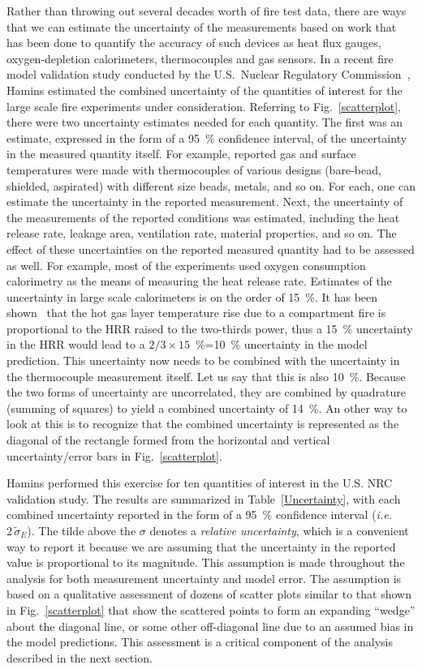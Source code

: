 Rather than throwing out several decades worth of fire test data, there are ways that we can estimate the uncertainty of the measurements based on work
that has been done to quantify the accuracy of such devices as heat flux gauges, oxygen-depletion calorimeters, thermocouples and gas sensors.
In a recent fire model validation study conducted by the U.S.~Nuclear Regulatory Commission~\cite{NUREG_1824}, Hamins estimated the combined
uncertainty of the quantities of interest for the large scale fire experiments under consideration. Referring to Fig.~\ref{scatterplot}, there were
two uncertainty estimates needed for each quantity. The first was an estimate, expressed in the form of a 95~\% confidence interval, of the
uncertainty in the measured quantity itself. For example, reported gas and surface temperatures were made with thermocouples of various designs (bare-bead,
shielded, aspirated) with different size beads, metals, and so on. For each, one can estimate the uncertainty in the reported measurement. Next, the
uncertainty of the measurements of the reported conditions was estimated, including the heat release rate, leakage area, ventilation rate, material
properties, and so on. The effect of these uncertainties on the reported measured quantity had to be assessed as well. For example, most of the
experiments used oxygen consumption calorimetry as the means of measuring the heat release rate.
Estimates of the uncertainty in large scale calorimeters is on the order of 15~\%. It has been shown~\cite{SFPE:Walton} that the hot gas layer temperature rise due to
a compartment fire is proportional to the HRR raised to the two-thirds power, thus a 15~\% uncertainty in the HRR would lead to a $2/3 \times 15$~\%=10~\%
uncertainty in the model prediction. This uncertainty now needs to be combined with the uncertainty in the thermocouple measurement itself. Let us say that
this is also 10~\%. Because the two forms of uncertainty are uncorrelated, they are combined by quadrature (summing of squares) to yield a combined
uncertainty of 14~\%. An other way to look at this is to recognize that the combined uncertainty is represented as the diagonal of the rectangle formed
from the horizontal and vertical uncertainty/error bars in Fig.~\ref{scatterplot}.

Hamins performed this exercise for ten quantities of interest in the U.S. NRC validation study. The results are summarized in Table~\ref{Uncertainty}, with
each combined uncertainty reported in the form of a 95~\% confidence interval ({\em i.e.} $2 \, \tilde{\sigma}_E$). The tilde above the $\sigma$ denotes a
{\em relative uncertainty}, which is a convenient way to report it because we are assuming that the uncertainty in the reported value is proportional to
its magnitude. This assumption is made throughout the analysis for both measurement uncertainty and model error. The assumption is based on a
qualitative assessment of dozens of scatter plots similar to that shown in Fig.~\ref{scatterplot} that show the scattered points to form an expanding ``wedge''
about the diagonal line, or some other off-diagonal line due to an assumed bias in the model predictions. This assessment is a critical component of the
analysis described in the next section.

